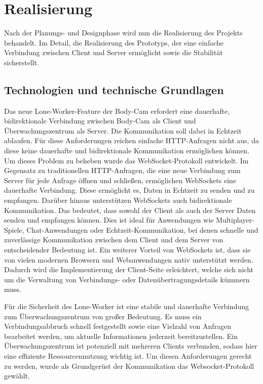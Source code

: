 \documentclass[thesis.tex]{subfiles}
\begin{document}
\chapter{Realisierung}\label{chap:realisierung}

Nach der Planungs- und Designphase wird nun die Realisierung des Projekts behandelt. Im Detail, die Realisierung des Prototyps, der eine einfache Verbindung zwischen Client und Server ermöglicht sowie die Stabilität sicherstellt.

\section{Technologien und technische Grundlagen}\label{chap:technologien}

Das neue Lone-Worker-Feature der Body-Cam erfordert eine dauerhafte, bidirektionale Verbindung zwischen Body-Cam als Client und Überwachungszentrum als Server.
Die Kommunikation soll dabei in Echtzeit ablaufen.
Für diese Anforderungen reichen einfache HTTP-Anfragen nicht aus, da diese keine dauerhafte und bidirektionale Kommunikation ermöglichen können.
Um dieses Problem zu beheben wurde das WebSocket-Protokoll entwickelt.
Im Gegensatz zu traditionellen HTTP-Anfragen, die eine neue Verbindung zum Server für jede Anfrage öffnen und schließen, ermöglichen WebSockets eine dauerhafte Verbindung.
Diese ermöglicht es, Daten in Echtzeit zu senden und zu empfangen.
Darüber hinaus unterstützen WebSockets auch bidirektionale Kommunikation.
Das bedeutet, dass sowohl der Client als auch der Server Daten senden und empfangen können.
Dies ist ideal für Anwendungen wie Multiplayer-Spiele, Chat-Anwendungen oder Echtzeit-Kommunikation, bei denen schnelle und zuverlässige Kommunikation zwischen dem Client und dem Server von entscheidender Bedeutung ist.
Ein weiterer Vorteil von WebSockets ist, dass sie von vielen modernen Browsern und Webanwendungen nativ unterstützt werden.
Dadurch wird die Implementierung der Client-Seite erleichtert, welche sich nicht um die Verwaltung von Verbindungs- oder Datenübertragungsdetails kümmern muss. \cite[vgl.~S.~4f][]{WebsocketProtokoll}

Für die Sicherheit des Lone-Worker ist eine stabile und dauerhafte Verbindung zum Überwachungszentrum von großer Bedeutung.
Es muss ein Verbindungsabbruch schnell festgestellt sowie eine Vielzahl von Anfragen bearbeitet werden, um aktuelle Informationen jederzeit bereitzustellen.
Ein Überwachungszentrum ist potenziell mit mehreren Clients verbunden, sodass hier eine effiziente Ressourcennutzung wichtig ist.
Um diesen Anforderungen gerecht zu werden, wurde als Grundgerüst der Kommunikation das Websocket-Protokoll gewählt.
\end{document}
